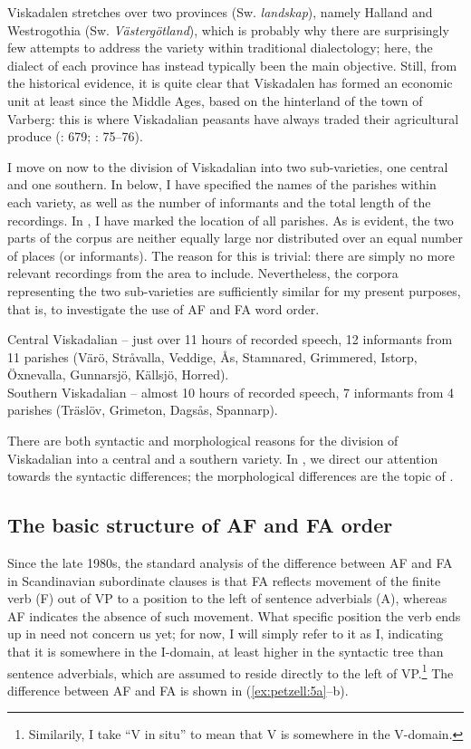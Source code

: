 \documentclass[output=paper,colorlinks,citecolor=brown,draft,draftmode]{langscibook}
\begin{document}
Viskadalen stretches over two provinces (Sw. \textit{landskap}), namely Halland and Westrogothia (Sw. \textit{Västergötland}), which is probably why there are surprisingly few attempts to address the variety within traditional dialectology; here, the dialect of each province has instead typically been the main objective. Still, from the historical evidence, it is quite clear that Viskadalen has formed an economic unit at least since the Middle Ages, based on the hinterland of the town of Varberg: this is where Viskadalian peasants have always traded their agricultural produce (\citealt{Grill1954}: 679; \citealt{Linge1969}: 75–76).



I move on now to the division of Viskadalian into two sub-varieties, one central and one southern. In  below, I have specified the names of the parishes within each variety, as well as the number of informants and the total length of the recordings. In , I have marked the location of all parishes. As is evident, the two parts of the corpus are neither equally large nor distributed over an equal number of places (or informants). The reason for this is trivial: there are simply no more relevant recordings from the area to include. Nevertheless, the corpora representing the two sub-varieties are sufficiently similar for my present purposes, that is, to investigate the use of AF and FA word order.


\ea\label{ex:petzell:4}
\ea  Central Viskadalian – just over 11 hours of recorded speech, 12 informants from 11 parishes (Värö, Stråvalla, Veddige, Ås, Stamnared, Grimmered, Istorp, Öxnevalla, Gunnarsjö, Källsjö, Horred).  \\
\ex\label{ex:petzell:4b}  Southern Viskadalian – almost 10 hours of recorded speech, 7 informants from 4 parishes (Träslöv, Grimeton, Dagsås, Spannarp).
\z
\z


There are both syntactic and morphological reasons for the division of Viskadalian into a central and a southern variety. In , we direct our attention towards the syntactic differences; the morphological differences are the topic of .


\subsection{The basic structure of AF and FA order}\label{sec:petzell:2.2}


Since the late 1980s, the standard analysis of the difference between AF and FA in Scandinavian subordinate clauses is that FA reflects movement of the finite verb (F) out of VP to a position to the left of sentence adverbials (A), whereas AF indicates the absence of such movement. What specific position the verb ends up in need not concern us yet; for now, I will simply refer to it as I, indicating that it is somewhere in the I-domain, at least higher in the syntactic tree than sentence adverbials, which are assumed to reside directly to the left of VP.\footnote{Similarily, I take “V in situ” to mean that V is somewhere in the V-domain.} The difference between AF and FA is shown in (\ref{ex:petzell:5a}–b).
\end{document}
